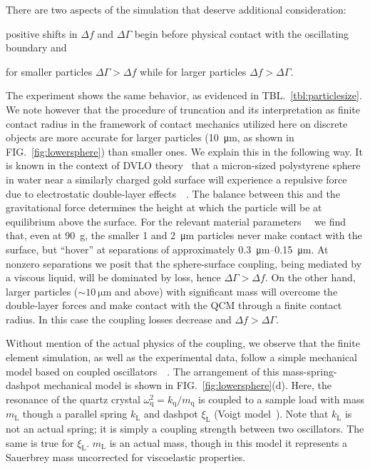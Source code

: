 \documentclass[floatfix,superscriptaddress,a4paper,twocolumn]{revtex4-1}
\newcommand{\Figure}[1]{FIG.~\ref{#1}}
\newcommand{\Table}[1]{TBL.~\ref{#1}}
\newcommand{\df}{\Delta\!f}
\newcommand{\dg}{\Delta\Gamma}
\newcommand{\xil}{\xi_\mathrm{L}}
\newcommand{\kl}{k_\mathrm{L}}
\newcommand{\ml}{m_\mathrm{L}}
\newcommand{\kq}{k_\mathrm{q}}
\newcommand{\mq}{m_\mathrm{q}}
\newcommand{\omegaq}{\omega_\mathrm{q}}
\begin{document}
There are two aspects of the simulation that deserve additional
consideration:
\begin{inparaenum}[(1)]
\item positive shifts in $\df$ and $\dg$ begin 
before physical contact with the oscillating boundary and 
\item for smaller particles $\dg>\df$ while for
larger particles $\df>\dg$.
\end{inparaenum}
The experiment shows the same behavior, as evidenced in
\Table{tbl:particlesize}.  We note however that the procedure of truncation
and its interpretation as finite contact radius in the framework of contact
mechanics utilized here on discrete objects are more accurate for larger
particles (\SI{10}{\micro\meter}, as shown in \Figure{fig:lowersphere})
than smaller ones.  We explain this in the following way.
It is known in
the context of DVLO theory~\cite{israelachvili2011intermolecular} that a
micron-sized polystyrene sphere in water near a similarly charged gold
surface will experience a repulsive force due to electrostatic double-layer
effects~\cite{alexander1987hydrodynamic}~\cite{flicker1993quantifying}.
The balance between this and the gravitational force determines the height
at which the particle will be at equilibrium above the surface.  For the
relevant material
parameters~\cite{israelachvili2011intermolecular}~\cite{sharma1992factors}
we find that, even at \SI{90}{g}, the smaller \num{1} and
\SI{2}{\micro\meter} particles never make contact with the surface, but
``hover'' at separations of approximately
\SIrange{0.3}{0.15}{\micro\meter}.  At nonzero separations we posit that
the sphere-surface coupling, being mediated by a viscous liquid, will be
dominated by loss, hence $\dg>\df$.  On the other hand, larger particles
($\sim\SI{10}{\micro\meter}$ and above) with significant mass will overcome
the double-layer forces and make contact with the QCM through a finite
contact radius.  In this case the coupling losses decrease and $\df>\dg$.

Without mention of the actual physics of the coupling, we observe that the
finite element simulation, as well as the experimental data, follow a simple
mechanical model based on coupled
oscillators~\cite{dybwad1985sensitive}~\cite{olsson2012probing}.  The
arrangement of this mass-spring-dashpot mechanical model is shown in
\Figure{fig:lowersphere}(d).  Here, the resonance of the quartz crystal
$\omegaq^2=\kq/\mq$ is coupled to a sample load with mass $\ml$ though a
parallel spring $\kl$ and dashpot $\xil$ (Voigt
model~\cite{sips1950mechanical}).  Note that $\kl$ is not an actual spring; it
is simply a coupling strength between two oscillators.  The same is true for
$\xil$.  $\ml$ is an actual mass, though in this model it represents a
Sauerbrey mass uncorrected for viscoelastic properties.  
\end{document}
